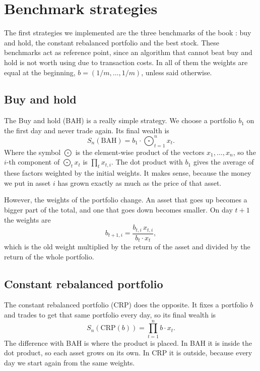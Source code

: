 \chapter{Benchmark strategies}

The first strategies we implemented are the three benchmarks of the book
\parencite[Ch.~3]{lihoi}: buy and hold, the constant rebalanced portfolio and the best
stock. These benchmarks act as reference point, since an algorithm that cannot beat buy and hold is not worth using due to transaction costs.
In all of them the weights are equal at the beginning, $b=(1/m,\dots,1/m)$,
unless said otherwise.

\section{Buy and hold}

The Buy and hold (BAH) is a really simple strategy. We choose a portfolio $b_1$ on the first
day and never trade again. Its final wealth is
\[
S_n(\mathrm{BAH}) = b_1\cdot\bigodot_{t=1}^{n} x_t .
\]
Where the symbol $\bigodot$ is the element-wise product of the vectors $x_1,\dots,x_n$, so the $i$-th component of
$\bigodot_t x_t$ is $\prod_t x_{t,i}$. The dot product with $b_1$ gives the
average of these factors weighted by the initial weights. It makes sense, because the
money we put in asset $i$ has grown exactly as much as the price of that asset.

However, the weights of the portfolio change. An asset that goes up
becomes a bigger part of the total, and one that goes down becomes smaller. On day
$t+1$ the weights are
\[
b_{t+1,i}=\frac{b_{t,i}\,x_{t,i}}{b_t\cdot x_t},
\]
which is the old weight multiplied by the return of the asset and divided by the
return of the whole portfolio. 

\section{Constant rebalanced portfolio}

The constant rebalanced portfolio (CRP) \parencite{cover91} does the opposite. It fixes
a portfolio $b$ and trades to get that same portfolio every day, so its final wealth is
\[
S_n(\mathrm{CRP}(b)) = \prod_{t=1}^{n} b\cdot x_t .
\]
The difference with BAH is where the product is placed. In BAH it is inside the dot product, 
so each asset grows on its own. In CRP it is outside, because every day we start again from the same weights.


